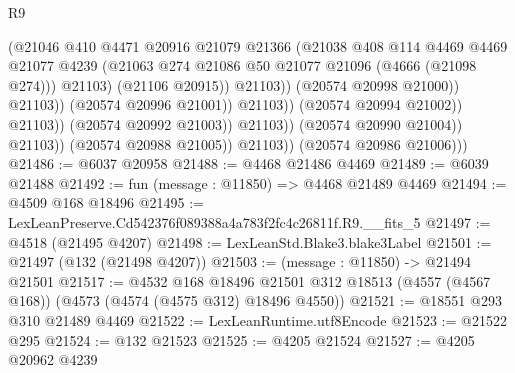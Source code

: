 \begin{lexlean}{R9}
\begin{coremodule}
                                                (@21046
                                                  @410
                                                  @4471
                                                  @20916
                                                  @21079
                                                  @21366
                                                  (@21038
                                                    @408
                                                    @114
                                                    @4469
                                                    @4469
                                                    @21077
                                                    @4239
                                                    (@21063
                                                      @274
                                                      @21086
                                                      @50
                                                      @21077
                                                      @21096
                                                      (@4666 (@21098 @274)))
                                                    @21103)
                                                  (@21106 @20915))
                                                @21103))
                                            (@20574 @20998 @21000))
                                          @21103))
                                      (@20574 @20996 @21001))
                                    @21103))
                                (@20574 @20994 @21002))
                              @21103))
                          (@20574 @20992 @21003))
                        @21103))
                    (@20574 @20990 @21004))
                  @21103))
              (@20574 @20988 @21005))
            @21103))
        (@20574 @20986 @21006)))
@21486 := @6037 @20958
@21488 := @4468 @21486 @4469
@21489 := @6039 @21488
@21492 := fun (message : @11850) => @4468 @21489 @4469
@21494 := @4509 @168 @18496
@21495 := LexLeanPreserve.Cd542376f089388a4a783f2fc4c26811f.R9.__fits_5
@21497 := @4518 (@21495 @4207)
@21498 := LexLeanStd.Blake3.blake3Label
@21501 := @21497 (@132 (@21498 @4207))
@21503 := (message : @11850) -> @21494 @21501
@21517 := @4532
    @168
    @18496
    @21501
    @312
    @18513
    (@4557 (@4567 @168))
    (@4573 (@4574 (@4575 @312) @18496 @4550))
@21521 := @18551 @293 @310 @21489 @4469
@21522 := LexLeanRuntime.utf8Encode
@21523 := @21522 @295
@21524 := @132 @21523
@21525 := @4205 @21524
@21527 := @4205 @20962 @4239

\end{coremodule}
\end{lexlean}
